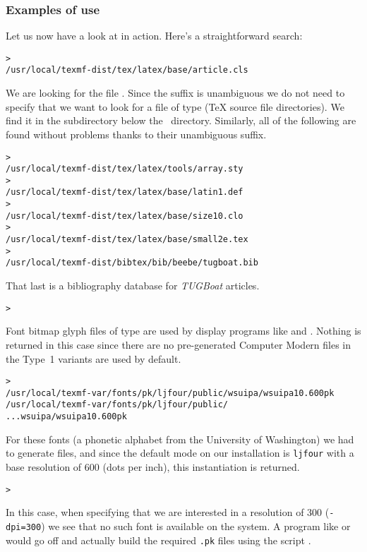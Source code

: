 \documentclass{article}
\begin{document}
\subsubsection{Examples of use}
\label{SExamplesofuse}

Let us now have a look at \KPS{} in action.  Here's a straightforward search:

\begin{alltt}
> 
   /usr/local/texmf-dist/tex/latex/base/article.cls
\end{alltt}
We are looking for the file . Since the 
suffix is unambiguous we do not need to specify that we want to look for a
file of type  (\TeX{} source file directories). We find it in
the subdirectory  below the  \TL\
directory.  Similarly, all of the following are found without problems
thanks to their unambiguous suffix.
\begin{alltt}
> 
   /usr/local/texmf-dist/tex/latex/tools/array.sty
> 
   /usr/local/texmf-dist/tex/latex/base/latin1.def
> 
   /usr/local/texmf-dist/tex/latex/base/size10.clo
> 
   /usr/local/texmf-dist/tex/latex/base/small2e.tex
> 
   /usr/local/texmf-dist/bibtex/bib/beebe/tugboat.bib
\end{alltt}

That last is a \BibTeX{} bibliography database for \textsl{TUGBoat} articles.

\begin{alltt}
> 
\end{alltt}
Font bitmap glyph files of type  are used by display
programs like  and .  Nothing is returned in
this case since there are no pre-generated Computer Modern \samp{.pk}
files in \TL{}\Dash the Type~1 variants are used by default.
\begin{alltt}
> 
\ifSingleColumn   /usr/local/texmf-var/fonts/pk/ljfour/public/wsuipa/wsuipa10.600pk
\else /usr/local/texmf-var/fonts/pk/ljfour/public/
...                         wsuipa/wsuipa10.600pk
\fi\end{alltt}

For these fonts (a phonetic alphabet from the University of Washington)
we had to generate \samp{.pk} files, and since the default \MF{} mode on
our installation is \texttt{ljfour} with a base resolution of 600\dpi{}
(dots per inch), this instantiation is returned.
\begin{alltt}
> 
\end{alltt}
In this case, when specifying that we are interested in a resolution
of 300\dpi{} (\texttt{-dpi=300}) we see that no such font is available on
the system. A program like \cmdname{dvips} or \cmdname{xdvi} would
go off and actually build the required \texttt{.pk} files
using the script .
\end{document}
